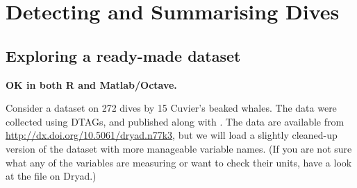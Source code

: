 \documentclass[12pt]{article}\usepackage[]{graphicx}\usepackage[]{color}
\begin{document}
\section{Detecting and Summarising Dives}
\subsection{Exploring a ready-made dataset}
\textbf{OK in both R and Matlab/Octave.}

Consider a dataset on 272 dives by 15 Cuvier's beaked whales. The data were collected using DTAGs, and published along with \cite{DeRuiter2013a}. The data are available from \url{http://dx.doi.org/10.5061/dryad.n77k3}, but we will load a slightly cleaned-up version of the dataset with more manageable variable names. (If you are not sure what any of the variables are measuring or want to check their units, have a look at the file on Dryad.)  
\end{document}

